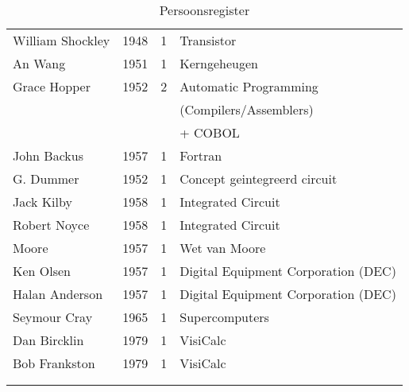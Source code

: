 \documentclass[../main.tex]{subfiles}
\begin{document}
\begin{longtable}{llll}
William Shockley		&	1948		&	1		&	Transistor	\\
An Wang					&	1951		&	1		&	Kerngeheugen	\\
Grace Hopper			&	1952		&	2		&	Automatic Programming \\
					 	&				&			&	(Compilers/Assemblers)	\\
					 	&				&			&	+ COBOL \\
John Backus				&	1957		&	1		&	Fortran	\\
G. Dummer				&	1952		&	1		&	Concept geintegreerd circuit	\\
Jack Kilby				&	1958		&	1		&	Integrated Circuit	\\
Robert Noyce			&	1958		&	1		&	Integrated Circuit	\\
Moore					&	1957		&	1		&	Wet van Moore	\\
Ken Olsen				&	1957		&	1		&	Digital Equipment Corporation (DEC)	\\
Halan Anderson			&	1957		&	1		&	Digital Equipment Corporation (DEC)	\\
Seymour Cray			&	1965		&	1		&	Supercomputers	\\
Dan Bircklin			&	1979		&	1		&	VisiCalc	\\
Bob Frankston			&	1979		&	1		&	VisiCalc	\\
\bottomrule
\label{table:personen}\\
\caption{Persoonsregister}\\
\end{longtable}
\end{document}
